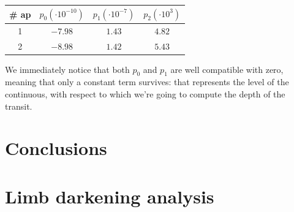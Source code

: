 \documentclass[a4paper,11pt,twocolumn]{article}
\begin{document}
\begin{center}
    \begin{tabular}{|c|c|c|c|}
    \hline
    \# ap & $p_0 (\cdot 10^{-10})$ & $p_1 (\cdot 10^{-7})$ & $p_2 ( \cdot 10^3)$ \\
    \hline
    1 &  $-7.98$   & $1.43$    &  $4.82$\\
    2 & $-8.98$ & $1.42$  & $5.43$\\
    \hline
    \end{tabular}
\end{center}
We immediately notice that both $p_0$ and $p_1$ are well compatible with zero,
meaning that only a constant term survives: that represents the level of the 
continuous, with respect to which we're going to compute the depth of the
transit.

\section{Conclusions}















\appendix
\section{Limb darkening analysis}
\label{sect:app_A}
\end{document}
